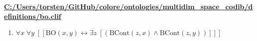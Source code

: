 \documentclass{article}
\begin{document}
\textbf{\url{C:/Users/torsten/GitHub/colore/ontologies/multidim\_space\_codib/definitions/bo.clif}}

\begin{enumerate}
\item $\forall x\; \forall y\;  \left[ \left[ \textrm{BO}(x,y) \leftrightarrow \exists z\;  \left[ \left(\textrm{BCont}(z,x) \land \textrm{BCont}(z,y)\right) \right] \right] \right]$
\end{enumerate}
\end{document}
